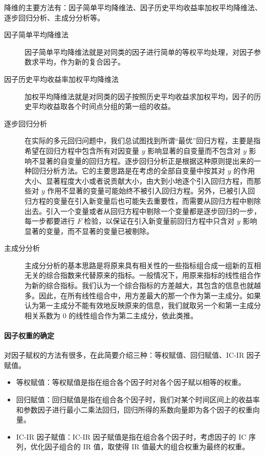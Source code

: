 降维的主要方法有：因子简单平均降维法、因子历史平均收益率加权平均降维法、逐步回归分析、主成分分析等。
\begin{description}
    \item[因子简单平均降维法] 因子简单平均降维法就是对同类的因子进行简单的等权平均处理，对因子参数求平均，作为新的复合因子。
    \item[因子历史平均收益率加权平均降维法] 加权平均降维法就是对同类的因子按照历史平均收益求加权平均，因子的历史平均收益取各个时间点分组的第一组的收益。
    \item[逐步回归分析] 在实际的多元回归问题中，我们总试图找到所谓“最优”回归方程，主要是指希望在回归方程中包含所有对因变量 $y$ 影响显著的自变量而不包含对 $y$ 影响不显著的自变量的回归方程。逐步回归分析正是根据这种原则提出来的一种回归分析方法。它的主要思路是在考虑的全部自变量中按其对 $y$ 的作用大小、显著程度大小或者说贡献大小，由大到小地逐个引入回归方程，而那些对 $y$ 作用不显著的变量可能始终不被引入回归方程。另外，已被引入回归方程的变量在引入新变量后也可能失去重要性，而需要从回归方程中剔除出去。引入一个变量或者从回归方程中剔除一个变量都是逐步回归的一步，每一步都要进行 $F$ 检验，以保证在引入新变量前回归方程中只含对 $y$ 影响显著的变量，而不显著的变量已被剔除。
    \item[主成分分析] 主成分分析的基本思路是将原来具有相关性的一些指标组合成一组新的互相无关的综合指数来代替原来的指标。一般情况下，用原来指标的线性组合作为新的综合指标。我们认为一个综合指标的方差越大，其包含的信息也就越多。因此，在所有线性组合中，用方差最大的那一个作为第一主成分。如果认为第一主成分不能有效地反映原来的信息，我们就取另一个和第一主成分相关系数为 0 的线性组合作为第二主成分，依此类推。
\end{description}
\paragraph{因子权重的确定} 对因子赋权的方法有很多，在此简要介绍三种：等权赋值、回归赋值、IC-IR 因子赋值。
\begin{itemize}
    \item 等权赋值：等权赋值是指在组合各个因子时对各个因子赋以相等的权重。
    \item 回归赋值：回归赋值是指在组合各个因子时，我们对某个时间区间上的收益率和参数因子进行最小二乘法回归，回归所得的系数向量即为各个因子的权重向量。
    \item IC-IR 因子赋值：IC-IR 因子赋值是指在组合各个因子时，考虑因子的 IC 序列，优化因子组合的 IR 值，取使得 IR 值最大的组合权重为最终的权重。
\end{itemize}

